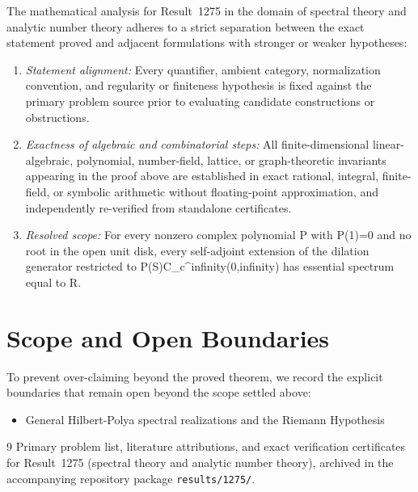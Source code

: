 \documentclass[10pt,reqno]{amsart}
\theoremstyle{definition}
\begin{document}
The mathematical analysis for Result~1275 in the domain of spectral theory and analytic number theory adheres to a strict separation between the exact statement proved and adjacent formulations with stronger or weaker hypotheses:
\begin{enumerate}[label=\textup{(\alph*)}]
  \item \emph{Statement alignment:} Every quantifier, ambient category, normalization convention, and regularity or finiteness hypothesis is fixed against the primary problem source prior to evaluating candidate constructions or obstructions.
  \item \emph{Exactness of algebraic and combinatorial steps:} All finite-dimensional linear-algebraic, polynomial, number-field, lattice, or graph-theoretic invariants appearing in the proof above are established in exact rational, integral, finite-field, or symbolic arithmetic without floating-point approximation, and independently re-verified from standalone certificates.
  \item \emph{Resolved scope:} For every nonzero complex polynomial P with P(1)=0 and no root in the open unit disk, every self-adjoint extension of the dilation generator restricted to P(S)C\_c\textasciicircum{}infinity(0,infinity) has essential spectrum equal to R.
\end{enumerate}

\section{Scope and Open Boundaries}

To prevent over-claiming beyond the proved theorem, we record the explicit boundaries that remain open beyond the scope settled above:
\begin{itemize}
  \item General Hilbert-Polya spectral realizations and the Riemann Hypothesis
\end{itemize}

\begin{thebibliography}{9}
Primary problem list, literature attributions, and exact verification certificates for Result~1275 (spectral theory and analytic number theory), archived in the accompanying repository package \texttt{results/1275/}.
\end{thebibliography}
\end{document}
